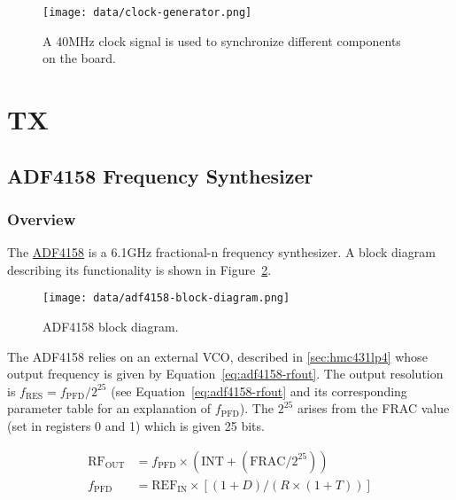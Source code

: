 \documentclass{default}
\begin{document}
\begin{figure}[h]
  \centering
  \texttt{[image: data/clock-generator.png]}
  \caption{A 40MHz clock signal is used to synchronize different components on the board.}
  \label{fig:clock-generator}
\end{figure}

\section{TX}



\subsection{ADF4158 Frequency Synthesizer}
\label{sec:adf4158-freq-synth}

\subsubsection{Overview}
\label{sec:adf4158-overview}

The \href{http://www.analog.com/media/en/technical-documentation/data-sheets/ADF4158.pdf}{ADF4158}
is a 6.1GHz fractional-n frequency synthesizer. A block diagram describing its functionality is shown in
Figure~\ref{fig:adf4158-block-diagram}.

\begin{figure}[h]
  \centering
  \texttt{[image: data/adf4158-block-diagram.png]}
  \caption{ADF4158 block diagram.}
  \label{fig:adf4158-block-diagram}
\end{figure}

The ADF4158 relies on an external VCO, described in \cref{sec:hmc431lp4} whose output frequency is
given by Equation~\ref{eq:adf4158-rfout}. The output resolution is
$f_{\text{RES}} = f_{\text{PFD}}/2^{25}$ (see Equation~\ref{eq:adf4158-rfout} and its corresponding
parameter table for an explanation of $f_{\text{PFD}}$). The $2^{25}$ arises from the FRAC value
(set in registers 0 and 1) which is given 25 bits.

\begin{align}
  \text{RF}_{\text{OUT}} &= f_{\text{PFD}} \times \left(\text{INT} +
                           \left(\text{FRAC}/2^{25}\right)\right) \label{eq:adf4158-rfout} \\
  f_{\text{PFD}} &= \text{REF}_{\text{IN}} \times \left[\left(1 + D\right)/\left(R\times \left(1 +
                   T\right)\right) \right] \nonumber
\end{align}
\end{document}

